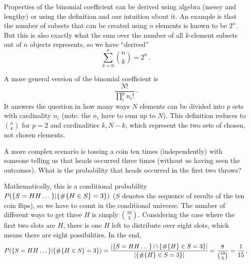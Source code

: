 Properties of the binomial coefficient can be derived using algebra (messy and lengthy) or using the definition and our intuition about it. An example is that the number of subsets that can be created using $n$ elements is known to be $2^n$. But this is also exactly what the sum over the number of all $k$-element subsets out of $n$ objects represents, so we have \enquote{derived}
\begin{equation}
\sum_{k = 0}^n \binom{n}{k} = 2^n \, .
\end{equation}


A more general version of the binomial coefficient is
\begin{equation}
\frac{N!}{\prod_i^p n_i!} \, .
\end{equation}
It answers the question in how many ways $N$ elements can be divided into $p$ sets with cardinality $n_i$ (note: the $n_i$ have to sum up to $N$). This definition reduces to $\binom{n}{k}$ for $p = 2$ and cardinalities $k, N - k$, which represent the two sets of chosen, not chosen elements.


\begin{ex}
A more complex scenario is tossing a coin ten times (independently) with someone telling us that heads occurred three times (without us having seen the outcomes). What is the probability that heads occurred in the first two throws?

Mathematically, this is a conditional probability $P\qty(\{S = HH \dots\} | \{\#\{H \in S\} = 3\})$ ($S$ denotes the sequence of results of the ten coin flips), so we have to count in the conditional universe. The number of different ways to get three $H$ is simply $\binom{10}{3}$. Considering the case where the first two slots are $H$, there is one $H$ left to distribute over eight slots, which means there are eight possibilities. In the end,
\begin{equation*}
P\qty(\{S = HH \dots\} | \{\#\{H \in S\} = 3\}) = \frac{\abs{\qty{S = HH \dots} \cap \qty{\#\qty{H} \in S = 3}}}{\abs{\qty{\#\qty{H} \in S = 3}}} = \frac{8}{\binom{10}{3}} = \frac{1}{15} \, .
\end{equation*}
\end{ex}


